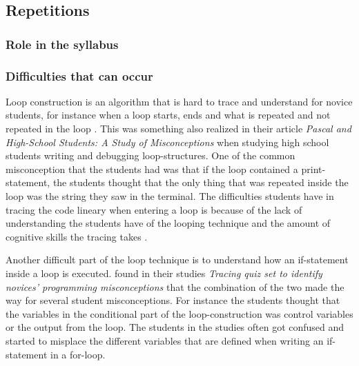\subsection{Repetitions}

\subsubsection{Role in the syllabus}

\subsubsection{Difficulties that can occur}

Loop construction is an algorithm that is hard to trace and understand for 
novice students, for instance when a loop starts, ends and what is repeated and 
not repeated in the loop \parencite{Sekiya2013,KumarVeerasamy2016,Kaczmarczyk2010}. 
This was something \textcite{Sleeman1984} also 
realized in their article \emph{Pascal and High-School Students: A Study of 
Misconceptions} when studying high school students writing and debugging 
loop-structures. One of the common misconception that the students had was that 
if the loop contained a print-statement, the students thought that the only 
thing that was repeated inside the loop was the string they saw in the 
terminal. The difficulties students have in tracing the code lineary when 
entering a loop is because of the lack of understanding the students have of 
the looping technique and the amount of cognitive skills the tracing takes 
\parencite{KumarVeerasamy2016}. 

Another difficult part of the loop technique is to understand how an if-statement inside a loop is executed. \textcite{Sekiya2013} found in their studies \emph{Tracing quiz set to identify novices' programming misconceptions} that the combination of the two made the way for several student misconceptions. For instance the students thought that the variables in the conditional part of the loop-construction was control variables or the output from the loop. The students in the studies often got confused and started to misplace the different variables that are defined when writing an if-statement in a for-loop.

